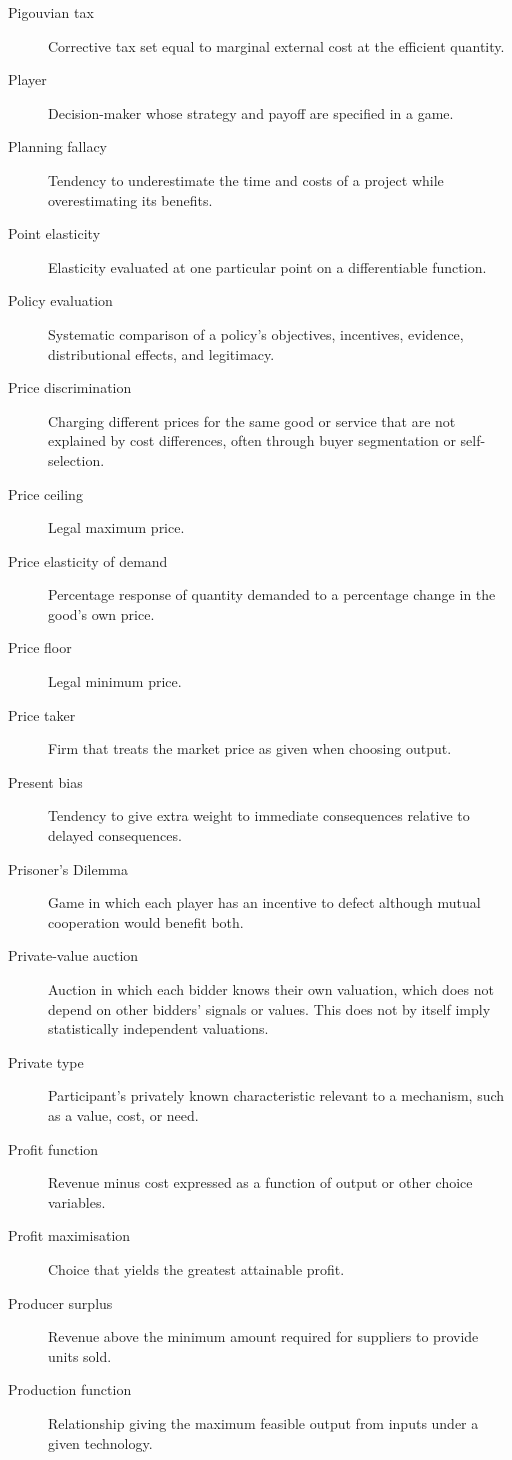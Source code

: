 \begin{description}
  \item[Pigouvian tax] Corrective tax set equal to marginal external cost at the efficient quantity.
  \item[Player] Decision-maker whose strategy and payoff are specified in a game.
  \item[Planning fallacy] Tendency to underestimate the time and costs of a project while overestimating its benefits.
  \item[Point elasticity] Elasticity evaluated at one particular point on a differentiable function.
  \item[Policy evaluation] Systematic comparison of a policy's objectives, incentives, evidence, distributional effects, and legitimacy.
  \item[Price discrimination] Charging different prices for the same good or
  service that are not explained by cost differences, often through buyer
  segmentation or self-selection.
  \item[Price ceiling] Legal maximum price.
  \item[Price elasticity of demand] Percentage response of quantity demanded to a percentage change in the good's own price.
  \item[Price floor] Legal minimum price.
  \item[Price taker] Firm that treats the market price as given when choosing output.
  \item[Present bias] Tendency to give extra weight to immediate consequences relative to delayed consequences.
  \item[Prisoner's Dilemma] Game in which each player has an incentive to defect although mutual cooperation would benefit both.
  \item[Private-value auction] Auction in which each bidder knows their own
  valuation, which does not depend on other bidders' signals or values. This
  does not by itself imply statistically independent valuations.
  \item[Private type] Participant's privately known characteristic relevant to a mechanism, such as a value, cost, or need.
  \item[Profit function] Revenue minus cost expressed as a function of output or other choice variables.
  \item[Profit maximisation] Choice that yields the greatest attainable profit.
  \item[Producer surplus] Revenue above the minimum amount required for suppliers to provide units sold.
  \item[Production function] Relationship giving the maximum feasible output from inputs under a given technology.

\end{description}

